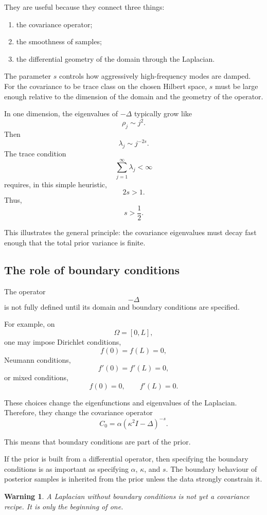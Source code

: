 \documentclass[11pt,a4paper]{book}
\newtheorem{warning}[definition]{Warning}
\begin{document}
They are useful because they connect three things:
\begin{enumerate}[label=\arabic*.]
    \item the covariance operator;
    \item the smoothness of samples;
    \item the differential geometry of the domain through the Laplacian.
\end{enumerate}

The parameter $s$ controls how aggressively high-frequency modes are damped.
For the covariance to be trace class on the chosen Hilbert space, $s$ must be
large enough relative to the dimension of the domain and the geometry of the
operator.

In one dimension, the eigenvalues of $-\Delta$ typically grow like
\[
    \rho_j \sim j^2.
\]
Then
\[
    \lambda_j
    \sim
    j^{-2s}.
\]
The trace condition
\[
    \sum_{j=1}^{\infty}\lambda_j<\infty
\]
requires, in this simple heuristic,
\[
    2s>1.
\]
Thus,
\[
    s>\frac{1}{2}.
\]

This illustrates the general principle: the covariance eigenvalues must decay
fast enough that the total prior variance is finite.

\subsection{The role of boundary conditions}

The operator
\[
    -\Delta
\]
is not fully defined until its domain and boundary conditions are specified.

For example, on
\[
    \Omega=[0,L],
\]
one may impose Dirichlet conditions,
\[
    f(0)=f(L)=0,
\]
Neumann conditions,
\[
    f'(0)=f'(L)=0,
\]
or mixed conditions,
\[
    f(0)=0,
    \qquad
    f'(L)=0.
\]

These choices change the eigenfunctions and eigenvalues of the Laplacian.
Therefore, they change the covariance operator
\[
    C_0
    =
    \alpha(\kappa^2 I-\Delta)^{-s}.
\]

This means that boundary conditions are part of the prior.

If the prior is built from a differential operator, then specifying the
boundary conditions is as important as specifying $\alpha$, $\kappa$, and $s$.
The boundary behaviour of posterior samples is inherited from the prior unless
the data strongly constrain it.

\begin{warning}
A Laplacian without boundary conditions is not yet a covariance recipe. It is
only the beginning of one.
\end{warning}
\end{document}
